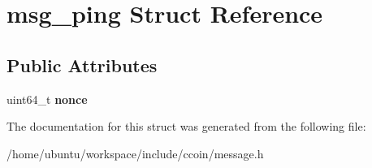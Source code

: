 \hypertarget{structmsg__ping}{\section{msg\-\_\-ping Struct Reference}
\label{structmsg__ping}
}
\subsection*{Public Attributes}
\begin{DoxyCompactItemize}
\item 
\hypertarget{structmsg__ping_a5dc8007537501e721ea12eb8b3df0428}{uint64\-\_\-t {\bfseries nonce}}\label{structmsg__ping_a5dc8007537501e721ea12eb8b3df0428}

\end{DoxyCompactItemize}


The documentation for this struct was generated from the following file\-:\begin{DoxyCompactItemize}
\item 
/home/ubuntu/workspace/include/ccoin/message.\-h\end{DoxyCompactItemize}
